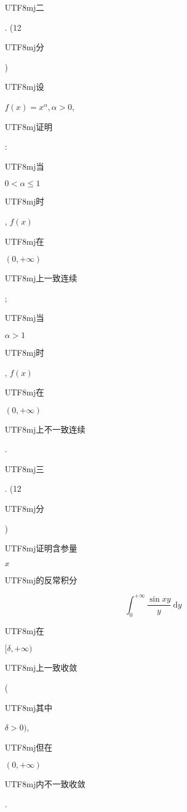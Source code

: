 \documentclass[10pt]{article}
\begin{document}
\begin{CJK}{UTF8}{mj}二\end{CJK}. (12 \begin{CJK}{UTF8}{mj}分\end{CJK}) \begin{CJK}{UTF8}{mj}设\end{CJK} $f(x)=x^{\alpha}, \alpha>0$, \begin{CJK}{UTF8}{mj}证明\end{CJK}: \begin{CJK}{UTF8}{mj}当\end{CJK} $0<\alpha \leqslant 1$ \begin{CJK}{UTF8}{mj}时\end{CJK}, $f(x)$ \begin{CJK}{UTF8}{mj}在\end{CJK} $(0,+\infty)$ \begin{CJK}{UTF8}{mj}上一致连续\end{CJK}; \begin{CJK}{UTF8}{mj}当\end{CJK} $\alpha>1$ \begin{CJK}{UTF8}{mj}时\end{CJK}, $f(x)$ \begin{CJK}{UTF8}{mj}在\end{CJK} $(0,+\infty)$ \begin{CJK}{UTF8}{mj}上不一致连续\end{CJK}.

\begin{CJK}{UTF8}{mj}三\end{CJK}. (12 \begin{CJK}{UTF8}{mj}分\end{CJK}) \begin{CJK}{UTF8}{mj}证明含参量\end{CJK} $x$ \begin{CJK}{UTF8}{mj}的反常积分\end{CJK}
$$
\int_{0}^{+\infty} \frac{\sin x y}{y} \mathrm{~d} y
$$
\begin{CJK}{UTF8}{mj}在\end{CJK} $[\delta,+\infty)$ \begin{CJK}{UTF8}{mj}上一致收敛\end{CJK} (\begin{CJK}{UTF8}{mj}其中\end{CJK} $\delta>0)$, \begin{CJK}{UTF8}{mj}但在\end{CJK} $(0,+\infty)$ \begin{CJK}{UTF8}{mj}内不一致收敛\end{CJK}.
\end{document}
